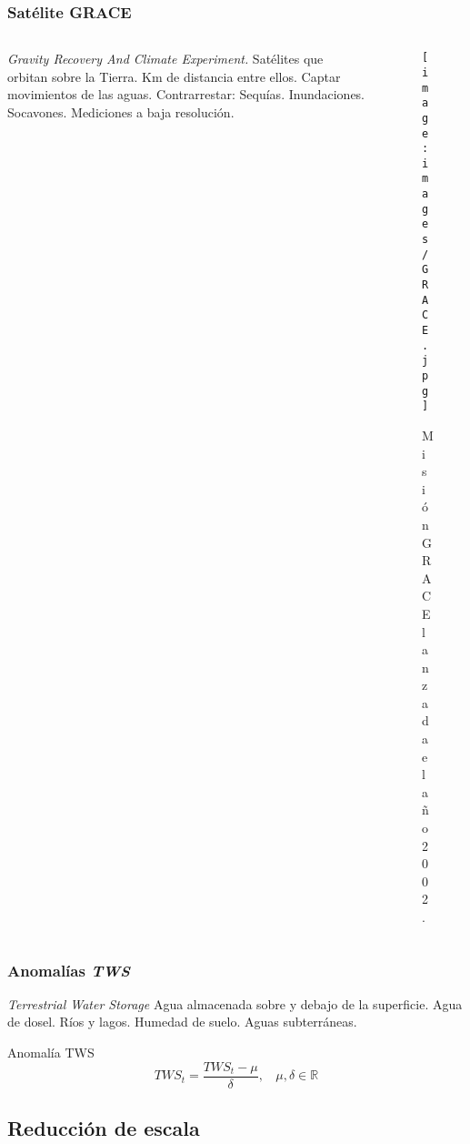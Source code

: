 \documentclass{beamer}
\begin{document}
  \begin{frame}
    \frametitle{Satélite GRACE}

    \begin{columns}

      \begin{column}{0.6\textwidth}
        \begin{outline}
          \1 \textit{Gravity Recovery And Climate Experiment.}
          \1 Satélites que orbitan sobre la Tierra.
             Km de distancia entre ellos.
          \1 Captar movimientos de las aguas.
          \2 Contrarrestar:
            \3 Sequías. 
            \3 Inundaciones.
            \3 Socavones.
          \1 Mediciones a baja resolución.
        \end{outline}
      \end{column}

      \begin{column}{0.5\textwidth}
        \begin{figure}
          \begin{center}
            \texttt{[image: images/GRACE.jpg]}
          \end{center}
          \caption{\tiny{Misión GRACE lanzada el año 2002.}}
        \end{figure}
      \end{column}

    \end{columns}

  \end{frame}

  \begin{frame}
    \frametitle{Anomalías \textit{TWS}}

    \begin{outline}
      \1 \textit{Terrestrial Water Storage}
      \1 Agua almacenada sobre y debajo de la superficie.
        \2 Agua de dosel.
        \2 Ríos y lagos.
        \2 Humedad de suelo.
        \2 Aguas subterráneas.
    \end{outline}

    \begin{block}{Anomalía TWS}
      $$ TWS_t = \frac{TWS_t - \mu}{\delta},~~~~ \mu, \delta \in \mathbb{R}$$
    \end{block}

  \end{frame}

  \subsection*{Reducción de escala}
\end{document}
